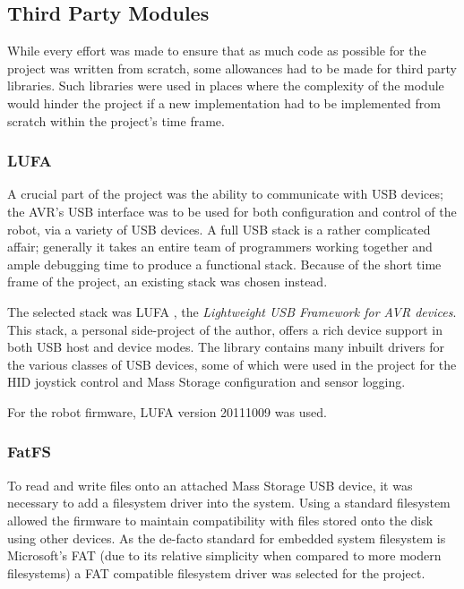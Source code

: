 \FloatBarrier
\subsection{Third Party Modules}

While every effort was made to ensure that as much code as possible for the project was written from scratch, some allowances had to be made for third party libraries. Such libraries were used in places where the complexity of the module would hinder the project if a new implementation had to be implemented from scratch within the project's time frame.

\FloatBarrier
\subsubsection{LUFA}

A crucial part of the project was the ability to communicate with USB devices; the AVR's USB interface was to be used for both configuration and control of the robot, via a variety of USB devices. A full USB stack is a rather complicated affair; generally it takes an entire team of programmers working together and ample debugging time to produce a functional stack. Because of the short time frame of the project, an existing stack was chosen instead.

The selected stack was LUFA \cite{lufa}, the \textit{Lightweight USB Framework for AVR devices}. This stack, a personal side-project of the author, offers a rich device support in both USB host and device modes. The library contains many inbuilt drivers for the various classes of USB devices, some of which were used in the project for the HID joystick control and Mass Storage configuration and sensor logging.

For the robot firmware, LUFA version 20111009 was used.

\FloatBarrier
\subsubsection{FatFS}

To read and write files onto an attached Mass Storage USB device, it was necessary to add a filesystem driver into the system. Using a standard filesystem allowed the firmware to maintain compatibility with files stored onto the disk using other devices. As the de-facto standard for embedded system filesystem is Microsoft's FAT (due to its relative simplicity when compared to more modern filesystems) a FAT compatible filesystem driver was selected for the project.

